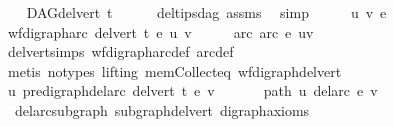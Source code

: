 \begin{isabellebody}
\ \ \isamarkupfalse%
\ {\isachardoublequoteopen}DAG{\isacharparenleft}{\kern0pt}del{\isacharunderscore}{\kern0pt}vert\ t{\isacharparenright}{\kern0pt}{\isachardoublequoteclose}\isanewline
\ \ \ \ \isamarkupfalse%
\ del{\isacharunderscore}{\kern0pt}tips{\isacharunderscore}{\kern0pt}dag\ assms\ \isamarkupfalse%
\ simp\isanewline
{}\isamarkupfalse%
\ \isanewline
\ \ \isamarkupfalse%
\ u\ v\ e\ \isanewline
\ \ \isamarkupfalse%
\ {\isachardoublequoteopen}wf{\isacharunderscore}{\kern0pt}digraph{\isachardot}{\kern0pt}arc\ {\isacharparenleft}{\kern0pt}del{\isacharunderscore}{\kern0pt}vert\ t{\isacharparenright}{\kern0pt}\ e\ {\isacharparenleft}{\kern0pt}u{\isacharcomma}{\kern0pt}\ v{\isacharparenright}{\kern0pt}{\isachardoublequoteclose}\isanewline
\ \ \isamarkupfalse%
\ \isamarkupfalse%
\ arc{\isacharcolon}{\kern0pt}\ {\isachardoublequoteopen}arc\ e\ {\isacharparenleft}{\kern0pt}u{\isacharcomma}{\kern0pt}v{\isacharparenright}{\kern0pt}{\isachardoublequoteclose}\ \isamarkupfalse%
\ del{\isacharunderscore}{\kern0pt}vert{\isacharunderscore}{\kern0pt}simps\ wf{\isacharunderscore}{\kern0pt}digraph{\isachardot}{\kern0pt}arc{\isacharunderscore}{\kern0pt}def\ arc{\isacharunderscore}{\kern0pt}def\isanewline
\ \ \ \ \isamarkupfalse%
\ {\isacharparenleft}{\kern0pt}metis\ {\isacharparenleft}{\kern0pt}no{\isacharunderscore}{\kern0pt}types{\isacharcomma}{\kern0pt}\ lifting{\isacharparenright}{\kern0pt}\ mem{\isacharunderscore}{\kern0pt}Collect{\isacharunderscore}{\kern0pt}eq\ wf{\isacharunderscore}{\kern0pt}digraph{\isacharunderscore}{\kern0pt}del{\isacharunderscore}{\kern0pt}vert{\isacharparenright}{\kern0pt}\isanewline
\ \ \isamarkupfalse%
\ {\isachardoublequoteopen}u\ {\isasymrightarrow}\isactrlsup {\isacharplus}{\kern0pt}\isactrlbsub pre{\isacharunderscore}{\kern0pt}digraph{\isachardot}{\kern0pt}del{\isacharunderscore}{\kern0pt}arc\ {\isacharparenleft}{\kern0pt}del{\isacharunderscore}{\kern0pt}vert\ t{\isacharparenright}{\kern0pt}\ e\isactrlesub \ v{\isachardoublequoteclose}\ \isanewline
\ \ \isamarkupfalse%
\ \isamarkupfalse%
\ path{\isacharcolon}{\kern0pt}\ {\isachardoublequoteopen}u\ {\isasymrightarrow}\isactrlsup {\isacharplus}{\kern0pt}\isactrlbsub del{\isacharunderscore}{\kern0pt}arc\ e\isactrlesub \ v{\isachardoublequoteclose}\isanewline
\ \ \ \ \isamarkupfalse%
\ \ del{\isacharunderscore}{\kern0pt}arc{\isacharunderscore}{\kern0pt}subgraph\ subgraph{\isacharunderscore}{\kern0pt}del{\isacharunderscore}{\kern0pt}vert\ digraph{\isacharunderscore}{\kern0pt}axioms\isanewline

\end{isabellebody}
